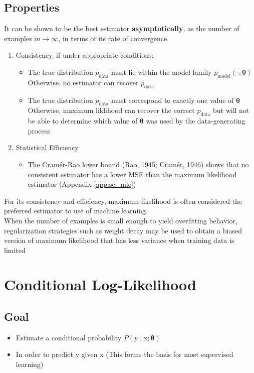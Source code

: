 \documentclass[12pt, a4paper]{article}
\def\vtheta{\boldsymbol{\theta}}
\def\vrmx{\boldsymbol{\mathrm{x}}}
\def\vrmy{\boldsymbol{\mathrm{y}}}
\newcommand{\condiP}[3]{P(#1 \mid #2;#3)}
\begin{document}
\subsection{Properties}
It can be shown to be the best estimator \textbf{asymptotically}, as the number of examples $m \to \infty$, in terms of its rate of convergence.
\begin{enumerate}
    \item Consistency, if under appropriate conditions:
        \begin{itemize}
            \item The true distribution $p_\text{data}$ must lie within the model family $p_\text{model}(\cdot ; \vtheta)$
                \\ Otherwise, no estimator can recover $p_\text{data}$
            \item The true distribution $p_\text{data}$ must correspond to exactly one value of $\vtheta$
                \\ Otherwise, maximum liklihood can recover the correct $p_\text{data}$ but will not be able to determine which value of $\vtheta$ was used by the data-generating process
        \end{itemize}
    \item Statistical Efficiency
        \begin{itemize}
            \item The Cramér-Rao lower bound (Rao, 1945; Cramér, 1946) shows that no consistent estimator has a lower MSE than the maximum likelihood estimator
                (Appendix \ref{app:se_mle})
        \end{itemize}
\end{enumerate}
For its consistency and efficiency, maximum likelihood is often considered the preferred estimator to use of machine learning.
\\ When the number of examples is small enough to yield overfitting behavior, regularization strategies such as weight decay may be used to obtain a biased version of maximum likelihood that has less variance when training data is limited


\section{Conditional Log-Likelihood}

\subsection{Goal}
\begin{itemize}
    \item Estimate a conditional probability $\condiP{\vrmy}{\vrmx}{\vtheta}$
    \item In order to predict $\vrmy$ given $\vrmx$ (This forms the basis for most supervised learning)
\end{itemize}
\end{document}
